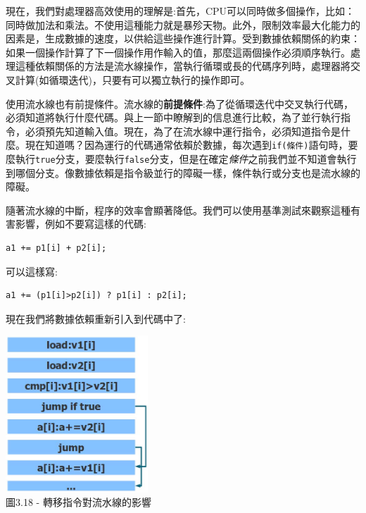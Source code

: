 現在，我們對處理器高效使用的理解是:首先，CPU可以同時做多個操作，比如：同時做加法和乘法。不使用這種能力就是暴殄天物。此外，限制效率最大化能力的因素是，生成數據的速度，以供給這些操作進行計算。受到數據依賴關係的約束：如果一個操作計算了下一個操作用作輸入的值，那麼這兩個操作必須順序執行。處理這種依賴關係的方法是流水線操作，當執行循環或長的代碼序列時，處理器將交叉計算(如循環迭代)，只要有可以獨立執行的操作即可。

使用流水線也有前提條件。流水線的\textbf{前提條件}:為了從循環迭代中交叉執行代碼，必須知道將執行什麼代碼。與上一節中瞭解到的信息進行比較，為了並行執行指令，必須預先知道輸入值。現在，為了在流水線中運行指令，必須知道指令是什麼。現在知道嗎？因為運行的代碼通常依賴於數據，每次遇到\texttt{if(條件)}語句時，要麼執行\texttt{true}分支，要麼執行\texttt{false}分支，但是在確定\textit{條件}之前我們並不知道會執行到哪個分支。像數據依賴是指令級並行的障礙一樣，條件執行或分支也是流水線的障礙。

隨著流水線的中斷，程序的效率會顯著降低。我們可以使用基準測試來觀察這種有害影響，例如不要寫這樣的代碼:

\begin{lstlisting}[style=styleCXX]
a1 += p1[i] + p2[i];
\end{lstlisting}

可以這樣寫:

\begin{lstlisting}[style=styleCXX]
a1 += (p1[i]>p2[i]) ? p1[i] : p2[i];
\end{lstlisting}

現在我們將數據依賴重新引入到代碼中了:

\begin{center}
\includegraphics[width=0.4\textwidth]{content/1/chapter3/images/18.jpg}\\
圖3.18 - 轉移指令對流水線的影響
\end{center}

